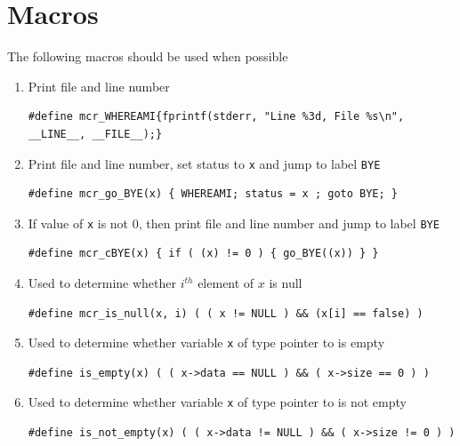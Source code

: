 \section{Macros}
\label{macros}
The following macros should be used when possible

\begin{enumerate}
  \item Print file and line number 
\begin{verbatim}
#define mcr_WHEREAMI{fprintf(stderr, "Line %3d, File %s\n", __LINE__, __FILE__);}
\end{verbatim}
\item Print file and line number, set status to {\tt x} and jump to label {\tt BYE}
\begin{verbatim}
#define mcr_go_BYE(x) { WHEREAMI; status = x ; goto BYE; }
\end{verbatim}
\item If value of {\tt x} is not 0, then 
print file and line number and jump to label {\tt BYE}
\begin{verbatim}
#define mcr_cBYE(x) { if ( (x) != 0 ) { go_BYE((x)) } }
\end{verbatim}

\item Used to determine whether \(i^{th}\) element of \(x\) is null
\begin{verbatim}
#define mcr_is_null(x, i) ( ( x != NULL ) && (x[i] == false) )
\end{verbatim}
\item Used to determine whether variable {\tt x} of type pointer to \qdf is empty 
\begin{verbatim}
#define is_empty(x) ( ( x->data == NULL ) && ( x->size == 0 ) ) 
\end{verbatim}
\item Used to determine whether variable {\tt x} of type pointer to \qdf is not empty 
\begin{verbatim}
#define is_not_empty(x) ( ( x->data != NULL ) && ( x->size != 0 ) ) 
\end{verbatim}

\end{enumerate}
